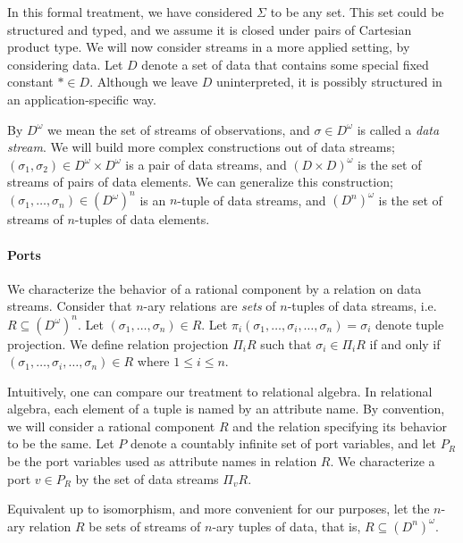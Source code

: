 In this formal treatment, we have considered $\Sigma$ to be any set.
This set could be structured and typed,
and we assume it is closed under pairs of Cartesian product type.
We will now consider streams in a more applied setting, by considering data.
Let $D$ denote a set of data that contains some special fixed constant $*\in D$.
Although we leave $D$ uninterpreted,
it is possibly structured in an application-specific way.

By $D^{\omega}$ we mean the set of streams of observations,
and $\sigma\in D^\omega$ is called a \emph{data stream}.
We will build more complex constructions out of data streams;
$(\sigma_1,\sigma_2)\in D^\omega\times D^\omega$ is a pair of data streams,
and $(D\times D)^\omega$ is the set of streams of pairs of data elements.
We can generalize this construction;
$(\sigma_1,\ldots,\sigma_n)\in(D^\omega)^n$ is an $n$-tuple of data streams,
and $(D^n)^\omega$ is the set of streams of $n$-tuples of data elements.


\paragraph{Ports}
We characterize the behavior of a rational component by a relation on data streams.
Consider that $n$-ary relations are \emph{sets} of $n$-tuples of data streams, i.e. $R\subseteq (D^\omega)^n$.
Let $(\sigma_{1},\ldots,\sigma_{n})\in R$.
Let $\pi_i(\sigma_{1},\ldots,\sigma_{i},\ldots,\sigma_{n})=\sigma_{i}$ denote tuple projection.
We define relation projection $\Pi_i R$ such that $\sigma_i\in\Pi_i R$ if and only if $(\sigma_{1},\ldots,\sigma_i,\ldots,\sigma_{n})\in R$ where $1\leq i\leq n$.

Intuitively, one can compare our treatment to relational algebra.
In relational algebra, each element of a tuple is named by an attribute name.
By convention, we will consider a rational component $R$ and the relation specifying its behavior
to be the same.
Let $P$ denote a countably infinite set of port variables, and let $P_R$ be the port variables
used as attribute names in relation $R$. We characterize a port $v\in P_R$ by the set of data streams $\Pi_v R$.

Equivalent up to isomorphism, and more convenient for our purposes,
let the $n$-ary relation $R$ be sets of streams of $n$-ary tuples of data,
that is, $R\subseteq (D^n)^\omega$.

